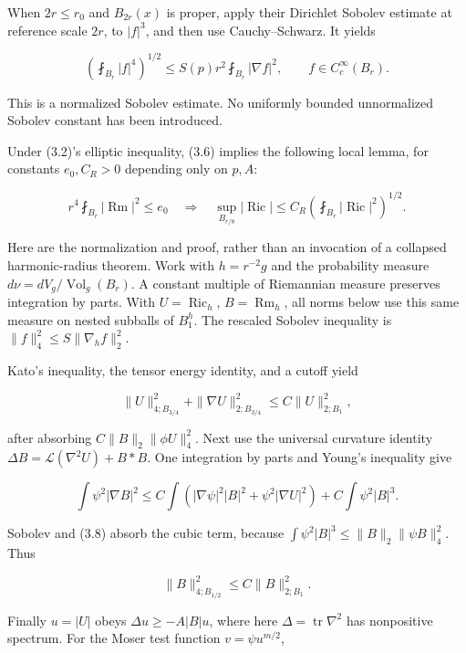 \documentclass[
  10pt,
]{article}
\begin{document}
When \(2r\le r_0\) and \(B_{2r}(x)\) is proper, apply their Dirichlet
Sobolev estimate at reference scale \(2r\), to \(|f|^3\), and then use
Cauchy--Schwarz. It yields

\[
 \left(\fint_{B_r}|f|^4\right)^{1/2}
            \le S(p)r^2\fint_{B_r}|\nabla f|^2,
                         \qquad f\in C_c^\infty(B_r).           \tag{3.6}
\]

This is a normalized Sobolev estimate. No uniformly bounded unnormalized
Sobolev constant has been introduced.

Under (3.2)'s elliptic inequality, (3.6) implies the following local
lemma, for constants \(e_0,C_R>0\) depending only on \(p,A\):

\[
 r^4\fint_{B_r}|\operatorname{Rm}|^2\le e_0
 \quad\Longrightarrow\quad
 \sup_{B_{r/8}}|\operatorname{Ric}|
                  \le C_R\left(\fint_{B_r}|\operatorname{Ric}|^2\right)^{1/2}.
                                                        \tag{3.7}
\]

Here are the normalization and proof, rather than an invocation of a
collapsed harmonic-radius theorem. Work with \(h=r^{-2}g\) and the
probability measure \(d\nu=dV_g/\operatorname{Vol}_g(B_r)\). A constant
multiple of Riemannian measure preserves integration by parts. With
\(U=\operatorname{Ric}_h\), \(B=\operatorname{Rm}_h\), all norms below
use this same measure on nested subballs of \(B_1^h\). The rescaled
Sobolev inequality is \(\|f\|_4^2\le S\|\nabla_hf\|_2^2\).

Kato's inequality, the tensor energy identity, and a cutoff yield

\[
 \|U\|_{4;B_{3/4}}^2+\|\nabla U\|_{2;B_{3/4}}^2
                              \le C\|U\|_{2;B_1}^2,             \tag{3.8}
\]

after absorbing \(C\|B\|_2\|\phi U\|_4^2\). Next use the universal
curvature identity \(\Delta B=\mathcal L(\nabla^2U)+B*B\). One
integration by parts and Young's inequality give

\[
 \int\psi^2|\nabla B|^2\le
 C\int(|\nabla\psi|^2|B|^2+\psi^2|\nabla U|^2)
                                      +C\int\psi^2|B|^3.
\]

Sobolev and (3.8) absorb the cubic term, because
\(\int\psi^2|B|^3\le\|B\|_2\|\psi B\|_4^2\). Thus

\[
                         \|B\|_{4;B_{1/2}}^2\le C\|B\|_{2;B_1}^2.
                                                        \tag{3.9}
\]

Finally \(u=|U|\) obeys \(\Delta u\ge-A|B|u\), where here
\(\Delta=\operatorname{tr}\nabla^2\) has nonpositive spectrum. For the
Moser test function \(v=\psi u^{m/2}\),
\end{document}
